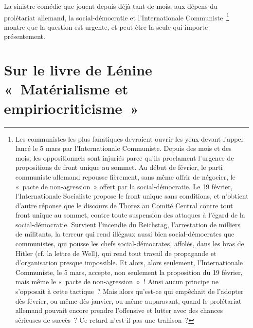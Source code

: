 \documentclass[french,twoside]{book} %
\begin{document}
La sinistre comédie que jouent depuis déjà tant de mois, aux dépens du prolétariat allemand, la social-démocratie et l'Internationale Communiste \footnote{Les communistes les plus fanatiques devraient ouvrir les yeux devant l'appel lancé le 5 mars par l'Internationale Communiste. Depuis des mois et des mois, les oppositionnels sont injuriés parce qu'ils proclament l'urgence de propositions de front unique au sommet. Au début de février, le parti communiste allemand repousse fièrement, sans même offrir de négocier, le « pacte de non-agression » offert par la social-démocratie. Le 19 février, l'Internationale Socialiste propose le front unique sans conditions, et n'obtient d'autre réponse que le discours de Thorez au Comité Central contre tout front unique au sommet, contre toute suspension des attaques à l'égard de la social-démocratie. Survient l'incendie du Reichstag, l'arrestation de milliers de militants, la terreur qui rend illégaux aussi bien social-démocrates que communistes, qui pousse les chefs social-démocrates, affolés, dans les bras de Hitler (cf. la lettre de Well), qui rend tout travail de propagande et d'organisation presque impossible. Et alors, alors seulement, l'Internationale Communiste, le 5 mars, accepte, non seulement la proposition du 19 février, mais même le « pacte de non-agression » ! Ainsi aucun principe ne s'opposait à cette tactique ? Mais alors qu'est-ce qui empêchait de l'adopter dès février, ou même dès janvier, ou même auparavant, quand le prolétariat allemand pouvait encore prendre l'offensive et lutter avec des chances sérieuses de succès ? Ce retard n'est-il pas une trahison ?} montre que la question est urgente, et peut-être la seule qui importe présentement.\par

\begin{center}
\noindent \centerline{}
\end{center}

\section[{Sur le livre de Lénine « Matérialisme et empiriocriticisme »}]{Sur le livre de Lénine « Matérialisme et empiriocriticisme »}\renewcommand{\leftmark}{Sur le livre de Lénine « Matérialisme et empiriocriticisme »}
\end{document}
